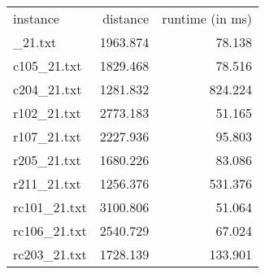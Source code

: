 \begin{table}[t]
\label{tab:result}
\begin{tabular}{lrr}
\toprule
instance & distance & runtime (in ms) \\ 
\midrulec103_21.txt & 1963.874 & 78.138 \\ 
c105_21.txt & 1829.468 & 78.516 \\ 
c204_21.txt & 1281.832 & 824.224 \\ 
r102_21.txt & 2773.183 & 51.165 \\ 
r107_21.txt & 2227.936 & 95.803 \\ 
r205_21.txt & 1680.226 & 83.086 \\ 
r211_21.txt & 1256.376 & 531.376 \\ 
rc101_21.txt & 3100.806 & 51.064 \\ 
rc106_21.txt & 2540.729 & 67.024 \\ 
rc203_21.txt & 1728.139 & 133.901 \\ 
\bottomrule 
\end{tabular} 
\end{table} 
